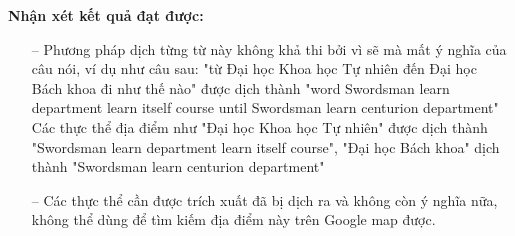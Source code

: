 \begin{table}[]
\begin{center}
\end{center}
\caption{Minh họa dữ liệu trước khi dịch và sau khi dịch}
    \label{fig:trainingdata_dichtungtu}
\end{table}

\textbf{Nhận xét kết quả đạt được:}
\begin{itemize}
    \item[--] Phương pháp dịch từng từ này không khả thi bởi vì sẽ mà mất ý nghĩa của câu nói, ví dụ như câu sau: "từ Đại học Khoa học Tự nhiên đến Đại học Bách khoa đi như thế nào" được dịch thành "word Swordsman learn department learn itself course until Swordsman learn centurion department" Các thực thể địa điểm như "Đại học Khoa học Tự nhiên" được dịch thành "Swordsman learn department learn itself course", "Đại học Bách khoa" dịch thành "Swordsman learn centurion department"
    \item[--] Các thực thể cần được trích xuất đã bị dịch ra và không còn ý nghĩa nữa, không thể dùng để tìm kiếm địa điểm này trên Google map được.
\end{itemize}
